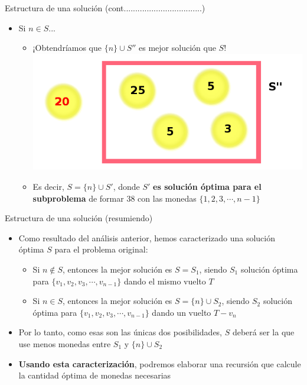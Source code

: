 \documentclass{beamer}
\begin{document}
\begin{frame}{Estructura de una solución (cont..................................)}
    \begin{itemize}
    \item Si $n \in S$...
            \begin{itemize}
                 \item ¡Obtendríamos que $\{n\} \cup S''$ es mejor solución que $S$!
                 \includegraphics[scale=0.4]{monedas3.png}
                 
                 \item Es decir, $S = \{n\} \cup S'$, donde $S'$ \textbf{es solución óptima para el subproblema} de formar $38$ con las monedas $\{1,2, 3, \cdots, n-1 \}$
            \end{itemize}
    
    \end{itemize} 
\end{frame}

\begin{frame}{Estructura de una solución (resumiendo)}
    \begin{itemize}
        \item Como resultado del análisis anterior, hemos caracterizado una solución óptima $S$ para el problema original:
        \begin{itemize}
            \item Si $n \notin S$, entonces la mejor solución es $S = S_1$, siendo $S_1$ solución óptima para $\{ v_1, v_2, v_3, \cdots, v_{n-1} \}$ dando el mismo vuelto $T$
            \item Si $n \in S$, entonces la mejor solución es $S = \{n\} \cup S_2$, siendo $S_2$ solución óptima para $\{ v_1, v_2, v_3, \cdots, v_{n-1} \}$ dando un vuelto $T - v_n$
        \end{itemize}
        \item Por lo tanto, como esas son las únicas dos posibilidades, $S$ deberá ser la que use menos monedas entre $S_1$ y $\{ n\} \cup S_2$
        \item \textbf{Usando esta caracterización}, podremos elaborar una recursión que calcule la cantidad óptima de monedas necesarias 
    \end{itemize} 
\end{frame}
\end{document}

